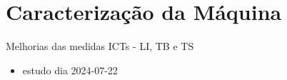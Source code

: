 \section{Caracterização da Máquina}



\begin{frame}{Melhorias das medidas ICTs - LI, TB e TS}

{\footnotesize
\begin{itemize}
    \item estudo dia 2024-07-22
\end{itemize}
}
\end{frame}
